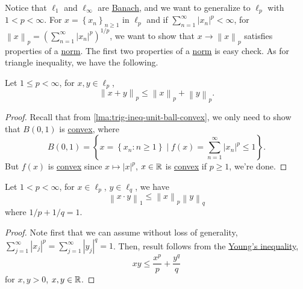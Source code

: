 Notice that \(\ell _1\) and \(\ell _\infty \) are \hyperref[def:Banach-space]{Banach}, and we want to generalize to \(\ell _p\) with \(1 < p < \infty \). For \(x = \left\{ x_n \right\}_{n\geq 1}\) in \(\ell _p\) and if \(\sum_{n=1}^{\infty} \left\vert x_n \right\vert ^p < \infty \), for \(\left\lVert x\right\rVert _p = \left( \sum_{n=1}^{\infty} \left\vert x_n \right\vert ^p \right)^{1 / p}\), we want to show that \(x \to \left\lVert x\right\rVert _p\) satisfies properties of a \hyperref[def:norm]{norm}. The first two properties of a \hyperref[def:norm]{norm} is easy check. As for triangle inequality, we have the following.

\begin{lemma}\label{lma:Minkowski-ineq}
	Let \(1 \leq p < \infty \), for \(x, y\in \ell _p\),
	\[
		\left\lVert x + y\right\rVert _p \leq \left\lVert x\right\rVert _p + \left\lVert y\right\rVert _p.
	\]
\end{lemma}
\begin{proof}
	Recall that from \autoref{lma:trig-ineq-unit-ball-convex}, we only need to show that \(B(0, 1)\) is \hyperref[def:convex-function]{convex}, where
	\[
		B(0, 1) = \left\{ x = \left\{ x_n\colon n\geq 1 \right\}\mid f(x) = \sum_{n=1}^{\infty} \left\vert x_n \right\vert ^p\leq 1  \right\}.
	\]
	But \(f(x)\) is \hyperref[def:convex-function]{convex} since \(x\mapsto \left\vert x \right\vert ^p\), \(x\in \mathbb{\MakeUppercase{r}} \) is \hyperref[def:convex-set]{convex} if \(p\geq 1\), we're done.
\end{proof}

\begin{lemma}\label{lma:Holder-ineq}
	Let \(1<p<\infty \), for \(x\in \ell _p\), \(y\in \ell _q\), we have
	\[
		\left\lVert x\cdot y\right\rVert_1 \leq \left\lVert x\right\rVert _p \left\lVert y\right\rVert _q
	\]
	where \(1 / p + 1 / q = 1\).
\end{lemma}
\begin{proof}
	Note first that we can assume without loss of generality, \(\sum_{j=1}^{\infty} \left\vert x_{j}  \right\vert ^p = \sum_{j=1}^{\infty} \left\vert y_{j}  \right\vert ^{q} = 1\). Then, result follows from the \href{https://en.wikipedia.org/wiki/Young's_inequality_for_products}{Young's inequality},
	\[
		xy \leq \frac{x^p}{p} + \frac{y^q}{q}
	\]
	for \(x, y> 0\), \(x, y\in \mathbb{\MakeUppercase{r}} \).
\end{proof}

